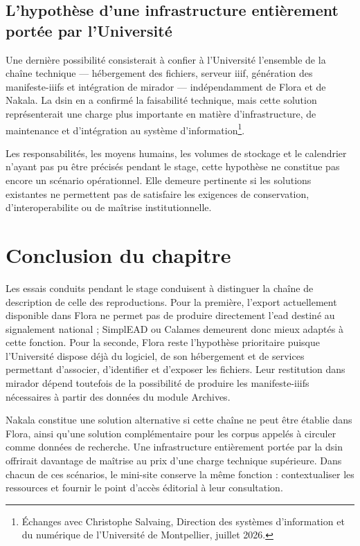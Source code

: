 \subsection{L'hypothèse d'une infrastructure entièrement portée par l'Université}

Une dernière possibilité consisterait à confier à l'Université l'ensemble de la chaîne technique --- hébergement des fichiers, serveur \gls{iiif}, génération des \glspl{manifeste-iiif} et intégration de \gls{mirador} --- indépendamment de Flora et de Nakala. La \gls{dsin} en a confirmé la faisabilité technique, mais cette solution représenterait une charge plus importante en matière d'infrastructure, de maintenance et d'intégration au système d'information\footnote{Échanges avec Christophe Salvaing, Direction des systèmes d'information et du numérique de l'Université de Montpellier, juillet 2026.}.

Les responsabilités, les moyens humains, les volumes de stockage et le calendrier n'ayant pas pu être précisés pendant le stage, cette hypothèse ne constitue pas encore un scénario opérationnel. Elle demeure pertinente si les solutions existantes ne permettent pas de satisfaire les exigences de conservation, d'\gls{interoperabilite} ou de maîtrise institutionnelle.


\section*{Conclusion du chapitre}
\label{sec:conclusion-descriptions-reproductions}

Les essais conduits pendant le stage conduisent à distinguer la chaîne de description de celle des reproductions. Pour la première, l'export actuellement disponible dans Flora ne permet pas de produire directement l'\gls{ead} destiné au \gls{signalement} national ; SimplEAD ou Calames demeurent donc mieux adaptés à cette fonction. Pour la seconde, Flora reste l'hypothèse prioritaire puisque l'Université dispose déjà du logiciel, de son hébergement et de services permettant d'associer, d'identifier et d'exposer les fichiers. Leur restitution dans \gls{mirador} dépend toutefois de la possibilité de produire les \glspl{manifeste-iiif} nécessaires à partir des données du module Archives.

Nakala constitue une solution alternative si cette chaîne ne peut être établie dans Flora, ainsi qu'une solution complémentaire pour les corpus appelés à circuler comme données de recherche. Une infrastructure entièrement portée par la \gls{dsin} offrirait davantage de maîtrise au prix d'une charge technique supérieure. Dans chacun de ces scénarios, le mini-site conserve la même fonction : contextualiser les ressources et fournir le point d'accès éditorial à leur consultation.

